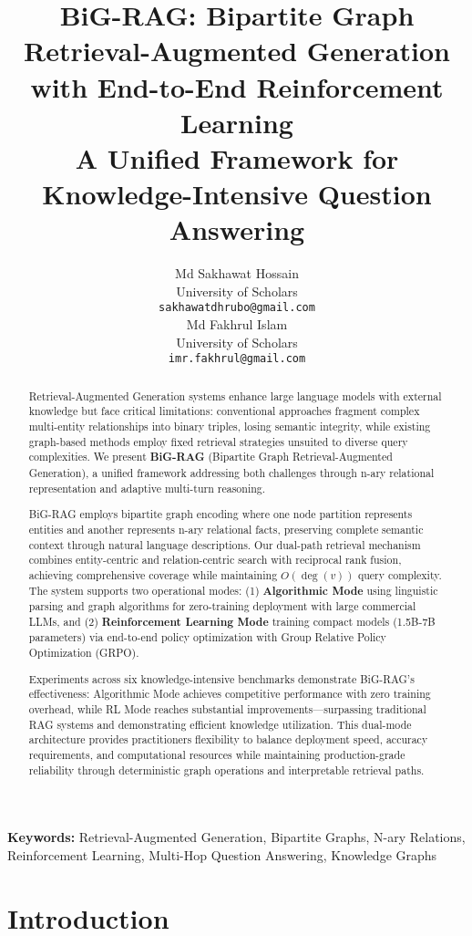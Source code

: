 \documentclass[11pt,a4paper]{article}
\title{\textbf{BiG-RAG: Bipartite Graph Retrieval-Augmented Generation with End-to-End Reinforcement Learning}\\
\large A Unified Framework for Knowledge-Intensive Question Answering}
\author{
Md Sakhawat Hossain \\
University of Scholars \\
\texttt{sakhawatdhrubo@gmail.com} \\
\And
Md Fakhrul Islam \\
University of Scholars \\
\texttt{imr.fakhrul@gmail.com}
}
\date{}
\begin{document}
\maketitle

\begin{abstract}
Retrieval-Augmented Generation systems enhance large language models with external knowledge but face critical limitations: conventional approaches fragment complex multi-entity relationships into binary triples, losing semantic integrity, while existing graph-based methods employ fixed retrieval strategies unsuited to diverse query complexities. We present \textbf{BiG-RAG} (Bipartite Graph Retrieval-Augmented Generation), a unified framework addressing both challenges through n-ary relational representation and adaptive multi-turn reasoning.

BiG-RAG employs bipartite graph encoding where one node partition represents entities and another represents n-ary relational facts, preserving complete semantic context through natural language descriptions. Our dual-path retrieval mechanism combines entity-centric and relation-centric search with reciprocal rank fusion, achieving comprehensive coverage while maintaining $O(\deg(v))$ query complexity. The system supports two operational modes: (1) \textbf{Algorithmic Mode} using linguistic parsing and graph algorithms for zero-training deployment with large commercial LLMs, and (2) \textbf{Reinforcement Learning Mode} training compact models (1.5B-7B parameters) via end-to-end policy optimization with Group Relative Policy Optimization (GRPO).

Experiments across six knowledge-intensive benchmarks demonstrate BiG-RAG's effectiveness: Algorithmic Mode achieves competitive performance with zero training overhead, while RL Mode reaches substantial improvements---surpassing traditional RAG systems and demonstrating efficient knowledge utilization. This dual-mode architecture provides practitioners flexibility to balance deployment speed, accuracy requirements, and computational resources while maintaining production-grade reliability through deterministic graph operations and interpretable retrieval paths.
\end{abstract}

\textbf{Keywords:} Retrieval-Augmented Generation, Bipartite Graphs, N-ary Relations, Reinforcement Learning, Multi-Hop Question Answering, Knowledge Graphs

\section{Introduction}
\end{document}
